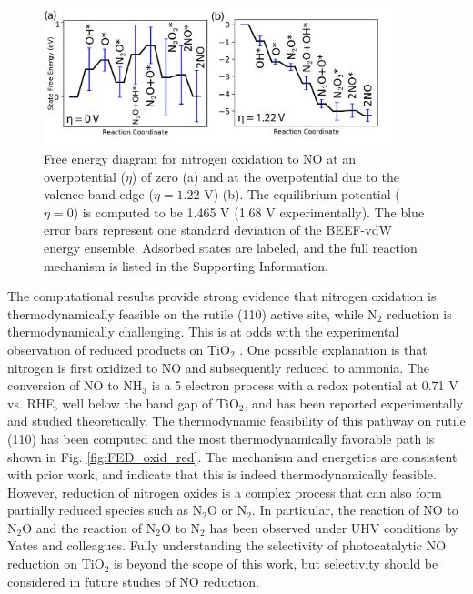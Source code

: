 \documentclass[journal=ascecg,manuscript=article,articletitle=true]{achemso}
\begin{document}
\begin{figure}
\includegraphics[width=0.9\textwidth]{figures/oxidative_FED.pdf}
\caption{Free energy diagram for nitrogen oxidation to NO at an overpotential ($\eta$) of zero (a) and at the overpotential due to the valence band edge ($\eta=1.22$ V) (b). The equilibrium potential ($\eta=0$) is computed to be 1.465 V (1.68 V experimentally). The blue error bars represent one standard deviation of the BEEF-vdW energy ensemble. Adsorbed states are labeled, and the full reaction mechanism is listed in the Supporting Information.}
\label{fig:FED_oxid}
\end{figure}

The computational results provide strong evidence that nitrogen oxidation is thermodynamically feasible on the rutile (110) active site, while N$_2$ reduction is thermodynamically challenging. This is at odds with the experimental observation of reduced products on TiO$_2$ \cite{Schrauzer_1977,Schrauzer_1983,Augugliaro_1982,Soria_1991,Schrauzer_2011,Hirakawa_2017}. One possible explanation is that nitrogen is first oxidized to NO and subsequently reduced to ammonia. The conversion of NO to NH$_3$ is a 5 electron process with a redox potential at 0.71 V vs. RHE, well below the band gap of TiO$_2$\cite{Medford_2017}, and has been reported experimentally\cite{Ranjit_1997} and studied theoretically\cite{Xie_2017}. The thermodynamic feasibility of this pathway on rutile (110) has been computed and the most thermodynamically favorable path is shown in Fig. \ref{fig:FED_oxid_red}. The mechanism and energetics are consistent with prior work\cite{Xie_2017}, and indicate that this is indeed thermodynamically feasible. However, reduction of nitrogen oxides is a complex process that can also form partially reduced species such as N$_2$O or N$_2$. In particular, the reaction of NO to N$_2$O and the reaction of N$_2$O to N$_2$ has been observed under UHV conditions by Yates and colleagues\cite{Rusu2000,Rusu2001}. Fully understanding the selectivity of photocatalytic NO reduction on TiO$_2$ is beyond the scope of this work, but selectivity should be considered in future studies of NO reduction.
\end{document}
